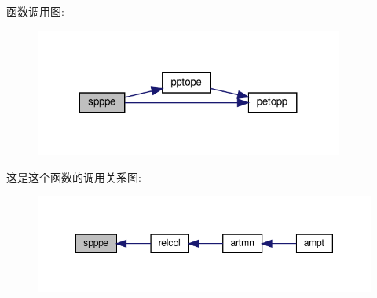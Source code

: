 函数调用图\+:
\nopagebreak
\begin{figure}[H]
\begin{center}
\leavevmode
\includegraphics[width=287pt]{spppe_8f90_a9cb6f6a63b7a1a2ae6aa07af2f4e24ac_cgraph}
\end{center}
\end{figure}
这是这个函数的调用关系图\+:
\nopagebreak
\begin{figure}[H]
\begin{center}
\leavevmode
\includegraphics[width=350pt]{spppe_8f90_a9cb6f6a63b7a1a2ae6aa07af2f4e24ac_icgraph}
\end{center}
\end{figure}
